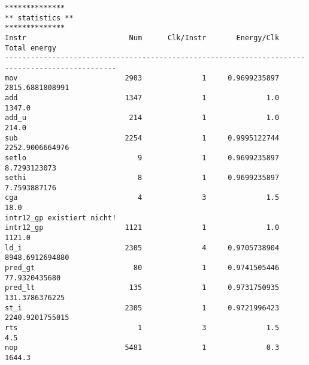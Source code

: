 \documentclass[oneside,11pt,accentcolor=tud2b, nochapname]{tudexercise}
\begin{document}

\begin{lstlisting}[caption={Endausgabe für das Ziel Performance-Max (Instanz 6x6) },captionpos=b, float, label={lst:performance}]
**************
** statistics **
**************
Instr          	             Num	  Clk/Instr	      Energy/Clk	    Total energy	
------------------------------------------------------------------------------------------------
mov            	            2903	          1	    0.9699235897	 2815.6881808991	
add            	            1347	          1	             1.0	          1347.0	
add_u          	             214	          1	             1.0	           214.0	
sub            	            2254	          1	    0.9995122744	 2252.9006664976	
setlo          	               9	          1	    0.9699235897	    8.7293123073	
sethi          	               8	          1	    0.9699235897	    7.7593887176	
cga            	               4	          3	             1.5	            18.0	
intr12_gp existiert nicht!
intr12_gp      	            1121	          1	             1.0	          1121.0	
ld_i           	            2305	          4	    0.9705738904	 8948.6912694880	
pred_gt        	              80	          1	    0.9741505446	   77.9320435680	
pred_lt        	             135	          1	    0.9731750935	  131.3786376225	
st_i           	            2305	          1	    0.9721996423	 2240.9201755015	
rts            	               1	          3	             1.5	             4.5	
nop            	            5481	          1	             0.3	          1644.3	




\end{lstlisting}
\end{document}
